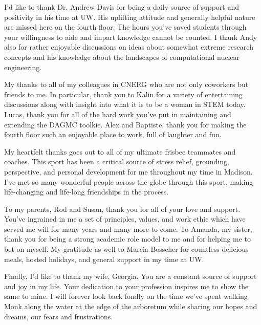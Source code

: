 I'd like to thank Dr. Andrew Davis for being a daily source of support and
positivity in his time at UW. His uplifting attitude and generally helpful
nature are missed here on the fourth floor. The hours you've saved students through
your willingness to aide and impart knowledge cannot be counted. I thank Andy
also for rather enjoyable discussions on ideas about somewhat extreme research
concepts and his knowledge about the landscapes of computational nuclear
engineering.

My thanks to all of my colleagues in CNERG who are not only coworkers but
friends to me. In particular, thank you to Kalin for a variety of entertaining
discussions along with insight into what it is to be a woman in STEM
today. Lucas, thank you for all of the hard work you've put in maintaining and
extending the DAGMC toolkie. Alex and Baptiste, thank you for making the fourth
floor such an enjoyable place to work, full of laughter and fun.

My heartfelt thanks goes out to all of my ultimate frisbee teammates and
coaches. This sport has been a critical source of stress relief, grounding,
perspective, and personal development for me throughout my time in Madison. I've
met so many wonderful people across the globe through this sport, making
life-changing and life-long friendships in the process.

To my parents, Rod and Susan, thank you for all of your love and support. You've
ingrained in me a set of principles, values, and work ethic which have served me
will for many years and many more to come. To Amanda, my sister, thank you for
being a strong academic role model to me and for helping me to bet on myself. My
gratitude as well to Marcia Bosscher for countless delicious meals, hosted
holidays, and general support in my time at UW.

Finally, I'd like to thank my wife, Georgia. You are a constant source of
support and joy in my life. Your dedication to your profession inspires me to
show the same to mine. I will forever look back fondly on the time we've spent
walking Monk along the water at the edge of the arboretum while sharing our
hopes and dreams, our fears and frustrations.
